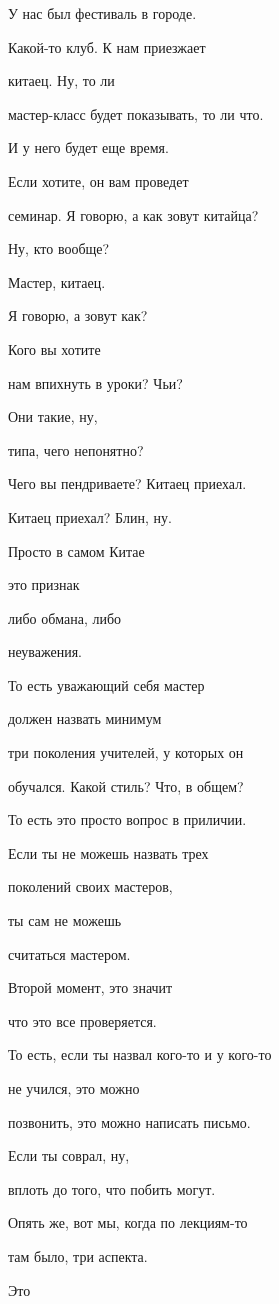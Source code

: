 У нас был фестиваль в городе.

Какой-то клуб. К нам приезжает

китаец. Ну, то ли

мастер-класс будет показывать, то ли что.

И у него будет еще время.

Если хотите, он вам проведет

семинар. Я говорю, а как зовут китайца?

Ну, кто вообще?

Мастер, китаец.

Я говорю, а зовут как?

Кого вы хотите

нам впихнуть в уроки? Чьи?

Они такие, ну,

типа, чего непонятно?

Чего вы пендриваете? Китаец приехал.

Китаец приехал? Блин, ну.

Просто в самом Китае

это признак

либо обмана, либо

неуважения.

То есть уважающий себя мастер

должен назвать минимум

три поколения учителей, у которых он

обучался. Какой стиль? Что, в общем?

То есть это просто вопрос в приличии.

Если ты не можешь назвать трех

поколений своих мастеров,

ты сам не можешь

считаться мастером.

Второй момент, это значит

что это все проверяется.

То есть, если ты назвал кого-то и у кого-то

не учился, это можно

позвонить, это можно написать письмо.

Если ты соврал, ну,

вплоть до того, что побить могут.

Опять же, вот мы, когда по лекциям-то

там было, три аспекта.

Это

